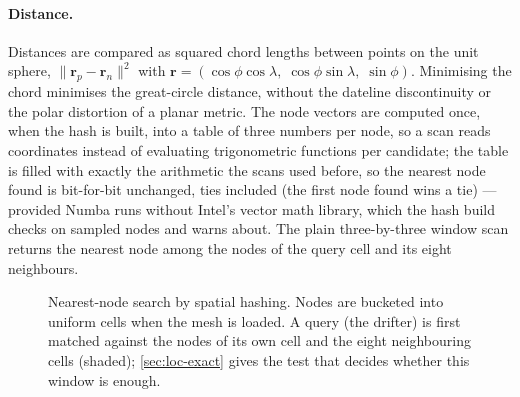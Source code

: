 \paragraph{Distance.} Distances are compared as squared chord lengths between points on the unit
sphere, $\lVert\mathbf{r}_p-\mathbf{r}_n\rVert^2$ with
$\mathbf{r}=(\cos\phi\cos\lambda,\;\cos\phi\sin\lambda,\;\sin\phi)$. Minimising the chord minimises the
great-circle distance, without the dateline discontinuity or the polar distortion of a planar
metric. The node vectors are computed once, when the hash is built, into a table of three numbers
per node, so a scan reads coordinates instead of evaluating trigonometric functions per candidate;
the table is filled with exactly the arithmetic the scans used before, so the nearest node found is
bit-for-bit unchanged, ties included (the first node found wins a tie) --- provided Numba runs without
Intel's vector math library, which the hash build checks on sampled nodes and warns about. The plain three-by-three
window scan returns the nearest node among the nodes of the query cell and its eight neighbours.

\begin{figure}[t]
\centering
{}
\caption{Nearest-node search by spatial hashing. Nodes are bucketed into uniform cells when the mesh
is loaded. A query (the drifter) is first matched against the nodes of its own cell and the eight
neighbouring cells (shaded); \cref{sec:loc-exact} gives the test that decides whether this window is
enough.}
\label{fig:gridhash}
\end{figure}


